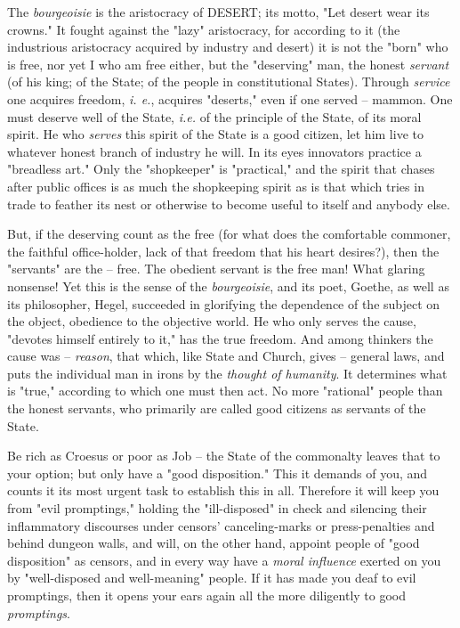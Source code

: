 \documentclass[a4paper]{book}
\begin{document}
The \textit{bourgeoisie} is the aristocracy of DESERT; its motto, "{}Let 
desert wear its crowns."{} It fought against the "{}lazy"{} aristocracy, for 
according to it (the industrious aristocracy acquired by industry and desert) 
it is not the "{}born"{} who is free, nor yet I who am free either, but the 
"{}deserving"{} man, the honest \textit{servant} (of his king; of the State; 
of the people in constitutional States). Through \textit{service} one acquires 
freedom, \textit{i. e.}, acquires "{}deserts,"{} even if one served -- mammon. 
One must deserve well of the State, \textit{i.e.} of the principle of the 
State, of its moral spirit. He who \textit{serves} this spirit of the State is 
a good citizen, let him live to whatever honest branch of industry he will. In 
its eyes innovators practice a "{}breadless art."{} Only the "{}shopkeeper"{} 
is "{}practical,"{} and the spirit that chases after public offices is as much 
the shopkeeping spirit as is that which tries in trade to feather its nest or 
otherwise to become useful to itself and anybody else.

But, if the deserving count as the free (for what does the comfortable 
commoner, the faithful office-holder, lack of that freedom that his heart 
desires?), then the "{}servants"{} are the -- free. The obedient servant is 
the free man! What glaring nonsense! Yet this is the sense of the 
\textit{bourgeoisie}, and its poet, Goethe, as well as its philosopher, Hegel, 
succeeded in glorifying the dependence of the subject on the object, obedience 
to the objective world. He who only serves the cause, "{}devotes himself 
entirely to it,"{} has the true freedom. And among thinkers the cause was -- 
\textit{reason}, that which, like State and Church, gives -- general laws, and 
puts the individual man in irons by the \textit{thought of humanity}. It 
determines what is "{}true,"{} according to which one must then act. No more 
"{}rational"{} people than the honest servants, who primarily are called good 
citizens as servants of the State.

Be rich as Croesus or poor as Job -- the State of the commonalty leaves that 
to your option; but only have a "{}good disposition."{} This it demands of 
you, and counts it its most urgent task to establish this in all. Therefore it 
will keep you from "{}evil promptings,"{} holding the "{}ill-disposed"{} in 
check and silencing their inflammatory discourses under censors' 
canceling-marks or press-penalties and behind dungeon walls, and will, on the 
other hand, appoint people of "{}good disposition"{} as censors, and in every 
way have a \textit{moral influence} exerted on you by "{}well-disposed and 
well-meaning"{} people. If it has made you deaf to evil promptings, then it 
opens your ears again all the more diligently to good \textit{promptings}.
\end{document}
